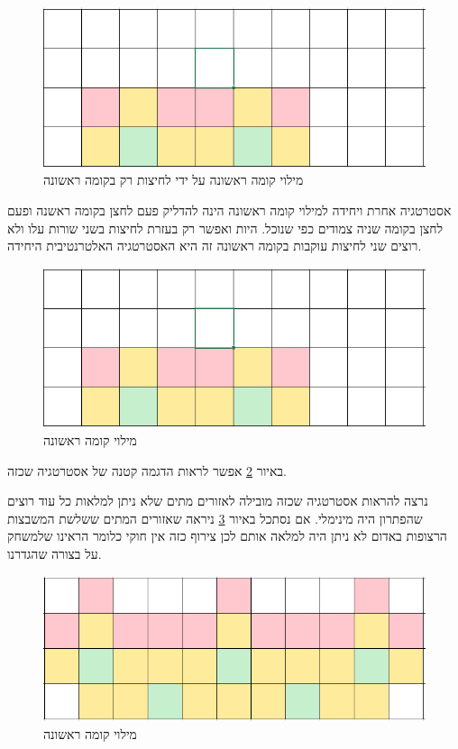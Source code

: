 \documentclass[12pt,twoside]{article}
\begin{document}
\begin{figure}[ht]
    \caption{מילוי קומה ראשונה על ידי לחיצות רק בקומה ראשונה}
    \label{fig: fill first stage only pressing first stage}
    \unsethebrew
    \centering
    \includegraphics[width=.7\textwidth,height=.7\textheight,keepaspectratio]{images/first_stage_fill_only_first_stage_click.PNG}
\end{figure}
\sethebrew

אסטרטגיה אחרת ויחידה למילוי קומה ראשונה הינה להדליק 
פעם לחצן בקומה ראשנה 
ופעם לחצן בקומה שניה צמודים כפי שנוכל.
היות ואפשר רק בעזרת לחיצות בשני שורות עלו ולא רוצים שני לחיצות עוקבות
בקומה ראשונה זה היא האסטרטגיה האלטרנטיבית היחידה.

\begin{figure}[ht]
    \caption{מילוי קומה ראשונה}
    \label{fig: fill first stage second attempt}
    \unsethebrew
    \centering
    \includegraphics[width=.7\textwidth,height=.7\textheight,keepaspectratio]{images/first_stage_fill_only_first_stage_click.PNG}
\end{figure}
\sethebrew

באיור 
\ref{fig: fill first stage second attempt}
אפשר לראות הדגמה קטנה של אסטרטגיה שכזה.

נרצה להראות אסטרטגיה שכזה מובילה לאזורים מתים שלא ניתן למלאות 
כל עוד רוצים שהפתרון היה מינימלי.
אם נסתכל באיור 
\ref{fig: fill first stage second attempt fails}
ניראה שאזורים המתים ששלשת
המשבצות הרצופות באדום לא ניתן היה למלאה אותם לכן צירוף כזה אין חוקי
כלומר הראינו שלמשחק על בצורה שהגדרנו.

\begin{figure}[ht]
    \caption{מילוי קומה ראשונה}
    \label{fig: fill first stage second attempt fails}
    \unsethebrew
    \centering
    \includegraphics[width=.7\textwidth,height=.7\textheight,keepaspectratio]{images/first_stage_fill_only_first_stage_click_fail.PNG}
\end{figure}
\sethebrew
\end{document}
